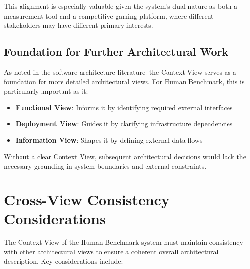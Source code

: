 This alignment is especially valuable given the system's dual nature as both a measurement tool
 and a competitive gaming platform, where different stakeholders may have different primary interests.

\subsection{Foundation for Further Architectural Work}

As noted in the software architecture literature, 
the Context View serves as a foundation for more detailed architectural views.
 For Human Benchmark, this is particularly important as it:

\begin{itemize}
    \item \textbf{Functional View}: Informs it by identifying required external interfaces
    \item \textbf{Deployment View}: Guides it by clarifying infrastructure dependencies
    \item \textbf{Information View}: Shapes it by defining external data flows
\end{itemize}

Without a clear Context View, subsequent architectural decisions would lack the necessary 
grounding in system boundaries and external constraints.

\section{Cross-View Consistency Considerations}

The Context View of the Human Benchmark system must maintain consistency with other architectural views 
to ensure a coherent overall architectural description. Key considerations include:



